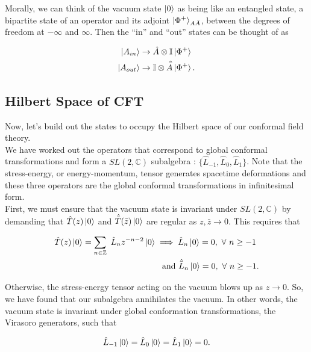 \noindent Morally, we can think of the vacuum state $\ket{0}$ as being like an entangled state, a bipartite state of an operator and its adjoint $\ket{\Phi^+}_{A\bar{A}}$, between the degrees of freedom at $-\infty$ and $\infty$. Then the ``in'' and ``out'' states can be thought of as

\begin{align}
\ket{A_{in}} &\rightarrow \hat{A} \otimes \mathbb{I} \ket{\Phi^+} \\
\ket{A_{out}} &\rightarrow \mathbb{I} \otimes \hat{\bar{A}} \ket{\Phi^+} .
\end{align}

\subsection*{Hilbert Space of CFT}

\noindent Now, let's build out the states to occupy the Hilbert space of our conformal field theory. \\

\noindent We have worked out the operators that correspond to global conformal transformations and form a $SL(2,\mathbb{C})$ subalgebra : $\{\hat{L}_{-1}, \hat{L}_0, \hat{L}_1 \}$. Note that the stress-energy, or energy-momentum, tensor generates spacetime deformations and these three operators are the global conformal transformations in infinitesimal form. \\

\noindent First, we must ensure that the vacuum state is invariant under $SL(2,\mathbb{C})$ by demanding that $\hat{T} (z) \ket{0}$ and $\hat{\bar{T}} (\bar{z}) \ket{0}$ are regular as $z,\bar{z} \rightarrow 0$. This requires that

\begin{align}
\hat{T} (z) \ket{0} = \sum_{n \in \mathbb{Z}} \,\, \hat{L}_n z^{-n-2} \ket{0} &\implies \hat{L}_n \ket{0} = 0, \,\, \forall \,\, n \ge -1 \\
&\,\,\,\,\, \text{and } \hat{\bar{L}}_n \ket{0} = 0, \,\, \forall \,\, n \ge -1.
\end{align}

\noindent Otherwise, the stress-energy tensor acting on the vacuum blows up as $z \rightarrow 0$. So, we have found that our subalgebra annihilates the vacuum. In other words, the vacuum state is invariant under global conformation transformations, the Virasoro generators, such that

\begin{equation}
\hat{L}_{-1} \ket{0} = \hat{L}_0 \ket{0} = \hat{L}_1 \ket{0} = 0.
\end{equation}

